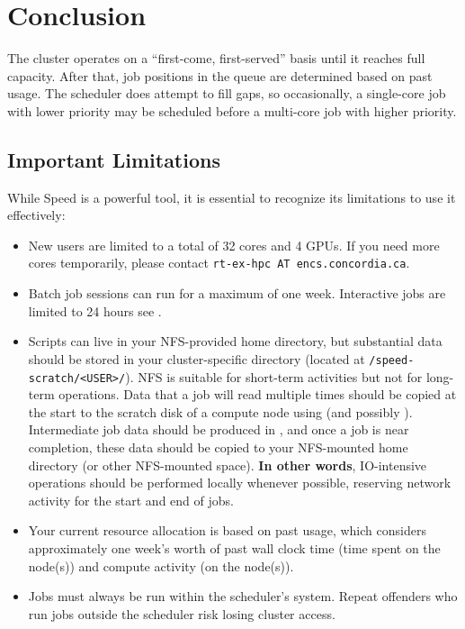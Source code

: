 \section{Conclusion}
\label{sect:conclusion}

The cluster operates on a ``first-come, first-served'' basis until it reaches full capacity.
After that, job positions in the queue are determined based on past usage.
The scheduler does attempt to fill gaps, so occasionally, a single-core job with lower priority
may be scheduled before a multi-core job with higher priority.

\subsection{Important Limitations}
\label{sect:limitations}

While Speed is a powerful tool, it is essential to recognize its limitations to use it effectively:

\begin{itemize}
	\item New users are limited to a total of 32 cores and 4 GPUs. If you need more cores temporarily,
	please contact \texttt{rt-ex-hpc AT encs.concordia.ca}.

	\item Batch job sessions can run for a maximum of one week.
	Interactive jobs are limited to 24 hours see .

	\item Scripts can live in your NFS-provided home directory, but substantial data should be stored in
    your cluster-specific directory (located at \verb+/speed-scratch/<USER>/+).
    NFS is suitable for short-term activities but not for long-term operations.
	Data that a job will read multiple times should be copied at the start to the scratch disk of a compute node using
	 (and possibly ).
	Intermediate job data should be produced in , and once a job is near completion,
	these data should be copied to your NFS-mounted home directory (or other NFS-mounted space).
	\textbf{In other words}, IO-intensive operations should be performed locally whenever possible,
	reserving network activity for the start and end of jobs.

	\item Your current resource allocation is based on past usage, which considers approximately
    one week's worth of past wall clock time (time spent on the node(s)) and compute activity (on the node(s)).

	\item Jobs must always be run within the scheduler's system. Repeat offenders who
	run jobs outside the scheduler risk losing cluster access.
\end{itemize}

